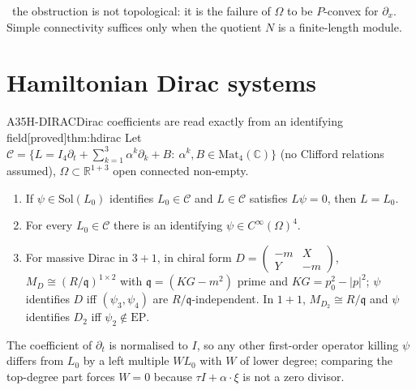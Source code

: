 \documentclass[11pt,a4paper,oneside]{report}
\newcommand{\whyworks}[1]{\par\smallskip\noindent{\small\sffamily\bfseries\color{cC}Why it works.}\ {\small #1}\par}
\newcommand{\badge}[2]{\textcolor{#1}{\textsf{\footnotesize[#2]}}}
\newcommand{\proved}{\badge{cC}{proved}}
\newcommand{\R}{\mathbb{R}}\newcommand{\C}{\mathbb{C}}\newcommand{\N}{\mathbb{N}}\newcommand{\Z}{\mathbb{Z}}\newcommand{\Q}{\mathbb{Q}}
\newcommand{\EP}{\mathrm{EP}}
\newenvironment{dimcard}[5]{\par\Needspace{12\baselineskip}\begin{dimcardbox}{#1}{#2}{#3}{#4}{#5}}{\end{dimcardbox}}
\begin{document}
\whyworks{the obstruction is not topological: it is the failure of $\Omega$ to be $P$-convex for $\partial_x$. Simple connectivity suffices only when the quotient $N$ is a finite-length module.}

\section{Hamiltonian Dirac systems}

\begin{dimcard}{A35}{H-DIRAC}{Dirac coefficients are read exactly from an identifying field}{\proved}{thm:hdirac}
Let $\mathcal C=\{L=I_4\partial_t+\sum_{k=1}^3\alpha^k\partial_k+B:\ \alpha^k,B\in\mathrm{Mat}_4(\C)\}$ (no Clifford relations assumed), $\Omega\subset\R^{1+3}$ open connected non-empty.
\begin{enumerate}[label=(\alph*)]
\item If $\psi\in\mathrm{Sol}(L_0)$ identifies $L_0\in\mathcal C$ and $L\in\mathcal C$ satisfies $L\psi=0$, then $L=L_0$.
\item For every $L_0\in\mathcal C$ there is an identifying $\psi\in C^\infty(\Omega)^4$.
\item For massive Dirac in $3+1$, in chiral form $D=\begin{pmatrix}-m&X\\Y&-m\end{pmatrix}$, $M_D\cong(R/\mathfrak q)^{1\times2}$ with $\mathfrak q=(KG-m^2)$ prime and $KG=p_0^2-|p|^2$; $\psi$ identifies $D$ iff $(\psi_3,\psi_4)$ are $R/\mathfrak q$-independent. In $1+1$, $M_{D_2}\cong R/\mathfrak q$ and $\psi$ identifies $D_2$ iff $\psi_2\notin\EP$.
\end{enumerate}
\end{dimcard}

\begin{proofidea}
The coefficient of $\partial_t$ is normalised to $I$, so any other first-order operator killing $\psi$ differs from $L_0$ by a left multiple $WL_0$ with $W$ of lower degree; comparing the top-degree part forces $W=0$ because $\tau I+\alpha\cdot\xi$ is not a zero divisor.
\end{proofidea}
\end{document}
